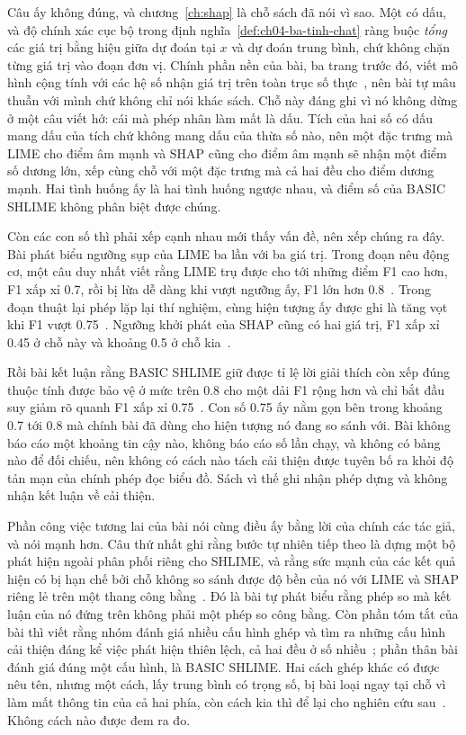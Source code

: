 %
Câu ấy không đúng, và chương~\ref{ch:shap} là chỗ sách đã nói vì sao. Một
 có dấu, và độ chính xác cục bộ trong định
nghĩa~\ref{def:ch04-ba-tinh-chat} ràng buộc \emph{tổng} các giá trị bằng hiệu
giữa dự đoán tại $x$ và dự đoán trung bình, chứ không chặn từng giá trị vào
đoạn đơn vị. Chính phần nền của bài, ba trang trước đó, viết mô hình cộng tính
với các hệ số nhận giá trị trên toàn trục số thực~\autocite{p27shlime}, nên bài
tự mâu thuẫn với mình chứ không chỉ nói khác sách. Chỗ này đáng ghi vì nó không
dừng ở một câu viết hớ: cái mà phép nhân làm mất là dấu. Tích của hai số có dấu
mang dấu của tích chứ không mang dấu của thừa số nào, nên một đặc trưng mà LIME
cho điểm âm mạnh và SHAP cũng cho điểm âm mạnh sẽ nhận một điểm số dương lớn,
xếp cùng chỗ với một đặc trưng mà cả hai đều cho điểm dương mạnh. Hai tình
huống ấy là hai tình huống ngược nhau, và điểm số của BASIC SHLIME không phân
biệt được chúng.

%
Còn các con số thì phải xếp cạnh nhau mới thấy vấn đề, nên xếp chúng ra đây.
Bài phát biểu ngưỡng sụp của LIME ba lần với ba giá trị. Trong đoạn nêu động
cơ, một câu duy nhất viết rằng LIME trụ được cho tới những điểm F1 cao hơn, F1
xấp xỉ 0.7, rồi bị lừa dễ dàng khi vượt ngưỡng ấy, F1 lớn hơn
0.8~\autocite{p27shlime}. Trong đoạn thuật lại phép lặp lại thí nghiệm, cùng
hiện tượng ấy được ghi là tăng vọt khi F1 vượt 0.75~\autocite{p27shlime}.
Ngưỡng khởi phát của SHAP cũng có hai giá trị, F1 xấp xỉ 0.45 ở chỗ này và
khoảng 0.5 ở chỗ kia~\autocite{p27shlime}.

Rồi bài kết luận rằng BASIC SHLIME giữ được tỉ lệ lời giải thích còn xếp đúng
thuộc tính được bảo vệ ở mức trên 0.8 cho một dải F1 rộng hơn và chỉ bắt đầu
suy giảm rõ quanh F1 xấp xỉ 0.75~\autocite{p27shlime}. Con số 0.75 ấy nằm gọn
bên trong khoảng 0.7 tới 0.8 mà chính bài đã dùng cho hiện tượng nó đang so
sánh với. Bài không báo cáo một khoảng tin cậy nào, không báo cáo số lần chạy,
và không có bảng nào để đối chiếu, nên không có cách nào tách cải thiện được
tuyên bố ra khỏi độ tản mạn của chính phép đọc biểu đồ. Sách vì thế ghi nhận
phép dựng và không nhận kết luận về cải thiện.

%
Phần công việc tương lai của bài nói cùng điều ấy bằng lời của chính các tác
giả, và nói mạnh hơn. Câu thứ nhất ghi rằng bước tự nhiên tiếp theo là dựng một
bộ phát hiện ngoài phân phối riêng cho SHLIME, và rằng sức mạnh của các kết quả
hiện có bị hạn chế bởi chỗ không so sánh được độ bền của nó với LIME và SHAP
riêng lẻ trên một thang công bằng~\autocite{p27shlime}. Đó là bài tự phát biểu
rằng phép so mà kết luận của nó đứng trên không phải một phép so công bằng. Còn
phần tóm tắt của bài thì viết rằng nhóm đánh giá nhiều cấu hình ghép và tìm ra
những cấu hình cải thiện đáng kể việc phát hiện thiên lệch, cả hai đều ở số
nhiều~\autocite{p27shlime}; phần thân bài đánh giá đúng một cấu hình, là BASIC
SHLIME. Hai cách ghép khác có được nêu tên, nhưng một cách, lấy trung bình có
trọng số, bị bài loại ngay tại chỗ vì làm mất thông tin của cả hai phía, còn
cách kia thì để lại cho nghiên cứu sau~\autocite{p27shlime}. Không cách nào
được đem ra đo.


